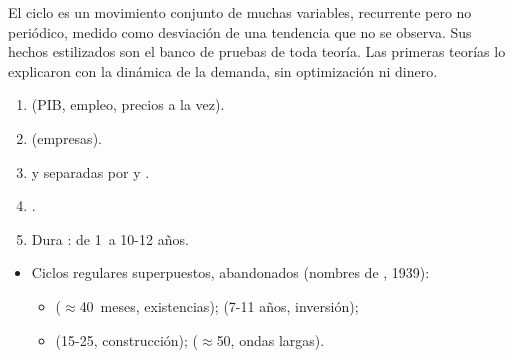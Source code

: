 \documentclass{article}
\begin{document}
\begin{columnas}
\begin{ideaclave}
El ciclo es un movimiento conjunto de muchas variables, recurrente pero no periódico, medido como desviación de una tendencia que no se observa. Sus hechos estilizados son el banco de pruebas de toda teoría. Las primeras teorías lo explicaron con la dinámica de la demanda, sin optimización ni dinero.
\end{ideaclave}

\begin{enumerate}
\item {} (PIB, empleo, precios a la vez).
\item {} (empresas).
\item {} y  separadas por  y .
\item {}.
\item Dura : de 1~a 10-12 años.
\end{enumerate}
\begin{itemize}
\item Ciclos regulares superpuestos, abandonados (nombres de , 1939):
  \begin{itemize}
  \item {} ($\approx$40~meses, existencias);  (7-11 años, inversión);
  \item {} (15-25, construcción);  ($\approx$50, ondas largas).
  \end{itemize}
\end{itemize}


\end{columnas}
\end{document}
